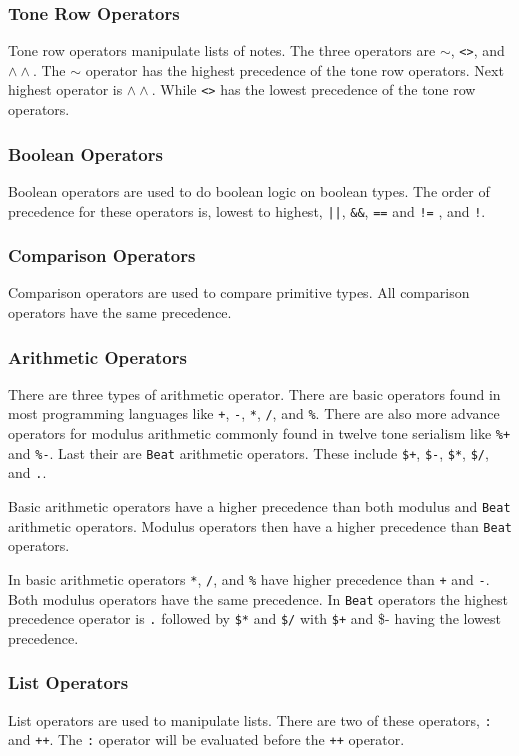 \subsubsection{Tone Row Operators}
Tone row operators manipulate lists of notes. 
The three operators are $\sim$, \texttt{<>}, and $\wedge\wedge$. 
The $\sim$ operator has the highest precedence of the tone row 
operators. Next highest operator is $\wedge\wedge$. While \texttt{<>} 
has the lowest precedence of the tone row operators. 
\subsubsection{Boolean Operators}
Boolean operators are used to do boolean logic on 
boolean types. The order of precedence for these 
operators is, lowest to highest, \texttt{||}, 
\texttt{\&\&}, \texttt{==} and \texttt{!=} , and \texttt{!}. 
\subsubsection{Comparison Operators}
Comparison operators are used to compare primitive types. 
All comparison operators have the same precedence. 
\subsubsection{Arithmetic Operators}
There are three types of arithmetic operator. There are 
basic operators found in most programming languages like 
\texttt{+}, \texttt{-}, \texttt{*}, \texttt{/}, and \texttt{\%}. 
There are also more advance operators for modulus arithmetic commonly 
found in twelve tone serialism like \texttt{\%+} and \texttt{\%-}. 
Last their are \texttt{Beat} arithmetic operators. 
These include \texttt{\$+}, \texttt{\$-}, \texttt{\$*}, \texttt{\$/}, 
and \texttt{.}. 

Basic arithmetic operators have a higher precedence than both
modulus and \texttt{Beat} arithmetic operators. Modulus operators 
then have a higher precedence than \texttt{Beat} operators. 

In basic arithmetic operators \texttt{*}, \texttt{/}, and \texttt{\%} 
have higher precedence than \texttt{+} and \texttt{-}. 
Both modulus operators have the same precedence. In \texttt{Beat} 
operators the highest precedence operator is \texttt{.} followed 
by \texttt{\$*} and \texttt{\$/} with \texttt{\$+} and {\$-} having 
the lowest precedence. 
\subsubsection{List Operators}
List operators are used to manipulate lists. 
There are two of these operators,
\texttt{:} and \texttt{++}. The \texttt{:} operator will be evaluated before the \texttt{++} operator. 

